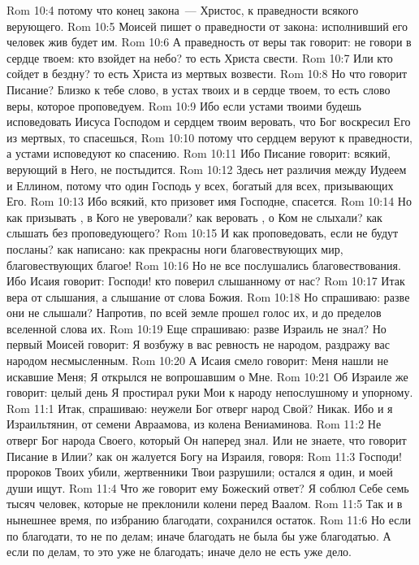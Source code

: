 \vs Rom 10:4 потому что конец закона~--- Христос, к праведности всякого верующего.
\vs Rom 10:5 Моисей пишет о праведности от закона: исполнивший его человек жив будет им.
\vs Rom 10:6 А праведность от веры так говорит: не говори в сердце твоем: кто взойдет на небо? то есть Христа свести.
\vs Rom 10:7 Или кто сойдет в бездну? то есть Христа из мертвых возвести.
\vs Rom 10:8 Но что говорит Писание? Близко к тебе слово, в устах твоих и в сердце твоем, то есть слово веры, которое проповедуем.
\vs Rom 10:9 Ибо если устами твоими будешь исповедовать Иисуса Господом и сердцем твоим веровать, что Бог воскресил Его из мертвых, то спасешься,
\vs Rom 10:10 потому что сердцем веруют к праведности, а устами исповедуют ко спасению.
\vs Rom 10:11 Ибо Писание говорит: всякий, верующий в Него, не постыдится.
\vs Rom 10:12 Здесь нет различия между Иудеем и Еллином, потому что один Господь у всех, богатый для всех, призывающих Его.
\vs Rom 10:13 Ибо всякий, кто призовет имя Господне, спасется.
\rsbpar\vs Rom 10:14 Но как призывать , в Кого не уверовали? как веровать , о Ком не слыхали? как слышать без проповедующего?
\vs Rom 10:15 И как проповедовать, если не будут посланы? как написано: как прекрасны ноги благовествующих мир, благовествующих благое!
\vs Rom 10:16 Но не все послушались благовествования. Ибо Исаия говорит: Господи! кто поверил слышанному от нас?
\vs Rom 10:17 Итак вера от слышания, а слышание от слова Божия.
\vs Rom 10:18 Но спрашиваю: разве они не слышали? Напротив, по всей земле прошел голос их, и до пределов вселенной слова их.
\vs Rom 10:19 Еще спрашиваю: разве Израиль не знал? Но первый Моисей говорит: Я возбужу в вас ревность не народом, раздражу вас народом несмысленным.
\vs Rom 10:20 А Исаия смело говорит: Меня нашли не искавшие Меня; Я открылся не вопрошавшим о Мне.
\vs Rom 10:21 Об Израиле же говорит: целый день Я простирал руки Мои к народу непослушному и упорному.
\vs Rom 11:1 Итак, спрашиваю: неужели Бог отверг народ Свой? Никак. Ибо и я Израильтянин, от семени Авраамова, из колена Вениаминова.
\vs Rom 11:2 Не отверг Бог народа Своего, который Он наперед знал. Или не знаете, что говорит Писание в  Илии? как он жалуется Богу на Израиля, говоря:
\vs Rom 11:3 Господи! пророков Твоих убили, жертвенники Твои разрушили; остался я один, и моей души ищут.
\vs Rom 11:4 Что же говорит ему Божеский ответ? Я соблюл Себе семь тысяч человек, которые не преклонили колени перед Ваалом.
\vs Rom 11:5 Так и в нынешнее время, по избранию благодати, сохранился остаток.
\vs Rom 11:6 Но если по благодати, то не по делам; иначе благодать не была бы уже благодатью. А если по делам, то это уже не благодать; иначе дело не есть уже дело.
